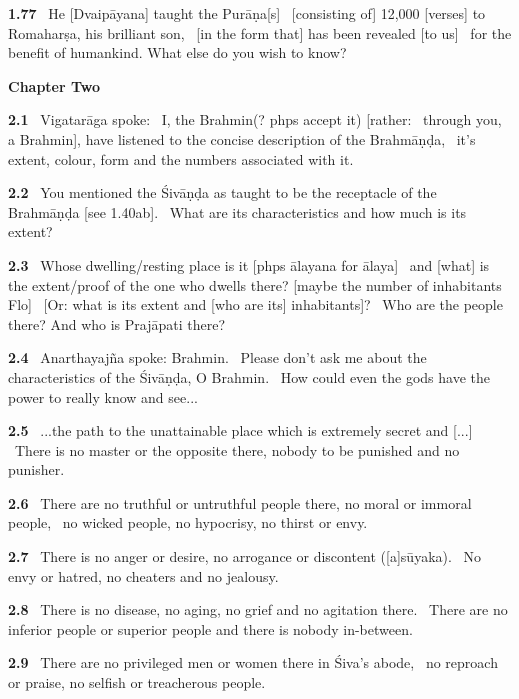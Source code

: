 \documentclass{article}
\begin{document}
\textbf{1.77}%
\ He [Dvaipāyana] taught the Purāṇa[s]%
\ [consisting of] 12,000 [verses] to Romaharṣa, his brilliant son,%
\                 [in the form that] has been revealed [to us]%
\ for the benefit of humankind. What else do you wish to know?%
\vfill\pagebreak\begin{center}{\large\textbf{  Chapter Two 
}}\end{center}


\textbf{2.1}%
\ Vigatarāga spoke:%
\ I, the Brahmin(? phps accept it) [rather:%
\         through you, a Brahmin], have listened to the concise description of the Brahmāṇḍa,%
\         it's extent, colour, form and the numbers associated with it.%


\textbf{2.2}%
\ You mentioned the Śivāṇḍa as taught to be the receptacle of the Brahmāṇḍa [see 1.40ab].%
\              What are its characteristics and how much is its extent?%


\textbf{2.3}%
\ Whose dwelling/resting place is it [phps ālayana for ālaya]%
\               and [what] is the extent/proof of the one who dwells there? [maybe the number of inhabitants Flo]%
\              [Or: what is its extent and [who are its] inhabitants]?%
\              Who are the people there? And who is Prajāpati there?%


\textbf{2.4}%
\ Anarthayajña spoke: Brahmin.%
\ Please don't ask me about the characteristics of the Śivāṇḍa, O Brahmin.%
\              How could even the gods have the power to really know and see...%


\textbf{2.5}%
\ ...the path to the unattainable place which is extremely secret and [...]%
\         There is no master or the opposite there, nobody to be punished and no punisher.%


\textbf{2.6}%
\ There are no truthful or untruthful people there, no moral or immoral people,%
\              no wicked people, no hypocrisy, no thirst or envy.%


\textbf{2.7}%
\ There is no anger or desire, no arrogance or discontent ([a]sūyaka).%
\                 No envy or hatred, no cheaters and no jealousy.%


\textbf{2.8}%
\ There is no disease, no aging, no grief and no agitation there.%
\                 There are no inferior people or superior people and there is nobody in-between.%


\textbf{2.9}%
\ There are no privileged men or women there in Śiva's abode,%
\              no reproach or praise, no selfish or treacherous people.%
\end{document}
